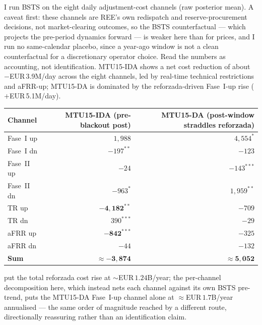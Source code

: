 \documentclass[11pt,a4paper]{article}
\theoremstyle{definition}
\theoremstyle{remark}
\theoremstyle{plain}
\begin{document}
I run BSTS on the eight daily adjustment-cost channels (raw posterior mean). A caveat first: these channels are REE's own redispatch and reserve-procurement decisions, not market-clearing outcomes, so the BSTS counterfactual --- which projects the pre-period dynamics forward --- is weaker here than for prices, and I run no same-calendar placebo, since a year-ago window is not a clean counterfactual for a discretionary operator choice. Read the numbers as accounting, not identification. MTU15-IDA shows a net cost reduction of about $-$EUR\,3.9M/day across the eight channels, led by real-time technical restrictions and aFRR-up; MTU15-DA is dominated by the reforzada-driven Fase~I-up rise ($+$EUR\,5.1M/day).

\begin{center}
\footnotesize
\setlength{\tabcolsep}{5pt}
\begin{tabular}{l r r}
\toprule
\textbf{Channel}    & \textbf{MTU15-IDA (pre-blackout post)} & \textbf{MTU15-DA (post-window straddles reforzada)} \\
\midrule
Fase~I up           & $1{,}988$              & $4{,}554^{*}$ \\
Fase~I dn           & $-197^{**}$             & $-123$ \\
Fase~II up          & $-24$                   & $-143^{***}$ \\
Fase~II dn          & $-963^{*}$              & $1{,}959^{**}$ \\
TR up               & $\mathbf{-4{,}182}^{**}$ & $-709$ \\
TR dn               & $390^{***}$            & $-29$ \\
aFRR up             & $\mathbf{-842}^{***}$    & $-325$ \\
aFRR dn             & $-44$                   & $-132$ \\
\midrule
\textbf{Sum}        & $\mathbf{\approx-3{,}874}$ & $\mathbf{\approx 5{,}052}$ \\
\bottomrule
\end{tabular}
\label{tab:bsts-ajuste-costs}
\end{center}

\citet{davi_arderius_graf_2026} put the total reforzada cost rise at $\sim$EUR\,$1.24$B/year; the per-channel decomposition here, which instead nets each channel against its own BSTS pre-trend, puts the MTU15-DA Fase~I-up channel alone at $\approx$EUR\,$1.7$B/year annualised --- the same order of magnitude reached by a different route, directionally reassuring rather than an identification claim.
\end{document}
